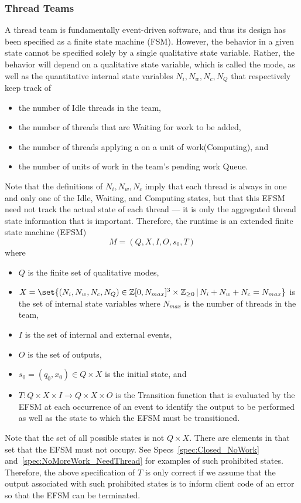 \documentclass{article}
\begin{document}
\subsubsection{Thread Teams}
A thread team is fundamentally event-driven software, and thus its design has
been specified as a finite state machine (FSM).  However, the behavior in a
given state cannot be specified solely by a single qualitative state variable.
Rather, the behavior will depend on a qualitative state variable, which is
called the mode, as well as the quantitative internal state variables $N_i, N_w,
N_c, N_Q$ that respectively keep track of
\begin{itemize}
\item{the number of Idle threads in the team,}
\item{the number of threads that are Waiting for work to be added,}
\item{the number of threads applying a \taskroutine on a unit of work(Computing), and}
\item{the number of units of work in the team's pending work Queue.}
\end{itemize}
Note that the definitions of $N_i, N_w, N_c$ imply that each thread is
always in one and only one of the Idle, Waiting, and Computing states, but that
this EFSM need not track the actual state of each thread --- it is only the
aggregated thread state information that is important.  Therefore, the runtime
is an extended finite state machine (EFSM)
\[
M = (Q, X, I, O, s_0, T)
\]
where
\begin{itemize}
\item{$Q$ is the finite set of qualitative modes,}
\item{$X = \set{(N_i, N_w, N_c, N_Q) \in \Z[0,N_{max}]^3\times\Z_{\ge 0}\,|\,N_i + N_w + N_c =
N_{max}}$ is the set of internal state variables where $N_{max}$ is the
number of threads in the team,}
\item{$I$ is the set of internal and external events,}
\item{$O$ is the set of outputs,}
\item{$s_0 = (q_0, x_0) \in Q \times X$ is the initial state, and}
\item{$T : Q \times X \times I \to Q \times X \times O$ is the Transition
function that is evaluated by the EFSM at each occurrence of an event to
identify the output to be performed as well as the state to which the EFSM must
be transitioned.}
\end{itemize}

Note that the set of all possible states is not $Q \times X$.  There are
elements in that set that the EFSM must not occupy.  See
Specs~\ref{spec:Closed_NoWork} and~\ref{spec:NoMoreWork_NeedThread} for examples
of such prohibited states.  Therefore, the above specification of $T$ is only
correct if we assume that the output associated with such prohibited states is
to inform client code of an error so that the EFSM can be terminated.\\
\end{document}
